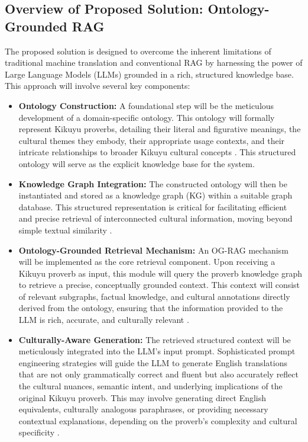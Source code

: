 \documentclass[12pt]{article}
\let\cite\textcite  %
\begin{document}
\subsection{Overview of Proposed Solution: Ontology-Grounded RAG}

The proposed solution is designed to overcome the inherent limitations of traditional machine translation and conventional RAG by harnessing the power of Large Language Models (LLMs) grounded in a rich, structured knowledge base. This approach will involve several key components:

\begin{itemize}
\item \textbf{Ontology Construction:} A foundational step will be the meticulous development of a domain-specific ontology. This ontology will formally represent Kikuyu proverbs, detailing their literal and figurative meanings, the cultural themes they embody, their appropriate usage contexts, and their intricate relationships to broader Kikuyu cultural concepts \cite{w3c2023owl, unesco2023digital}. This structured ontology will serve as the explicit knowledge base for the system.

\item \textbf{Knowledge Graph Integration:} The constructed ontology will then be instantiated and stored as a knowledge graph (KG) within a suitable graph database. This structured representation is critical for facilitating efficient and precise retrieval of interconnected cultural information, moving beyond simple textual similarity \cite{datacamp2024kg, googleai2023rag, chen2024og, datacamp2024kg}.

\item \textbf{Ontology-Grounded Retrieval Mechanism:} An OG-RAG mechanism will be implemented as the core retrieval component. Upon receiving a Kikuyu proverb as input, this module will query the proverb knowledge graph to retrieve a precise, conceptually grounded context. This context will consist of relevant subgraphs, factual knowledge, and cultural annotations directly derived from the ontology, ensuring that the information provided to the LLM is rich, accurate, and culturally relevant \cite{chen2024og, chen2024integrating, chen2024integrating}.

\item \textbf{Culturally-Aware Generation:} The retrieved structured context will be meticulously integrated into the LLM's input prompt. Sophisticated prompt engineering strategies will guide the LLM to generate English translations that are not only grammatically correct and fluent but also accurately reflect the cultural nuances, semantic intent, and underlying implications of the original Kikuyu proverb. This may involve generating direct English equivalents, culturally analogous paraphrases, or providing necessary contextual explanations, depending on the proverb's complexity and cultural specificity \cite{li2024rag, datacamp2024kg, datacamp2024kg, chen2024integrating, smith2023prompt}.
\end{itemize}
\end{document}
